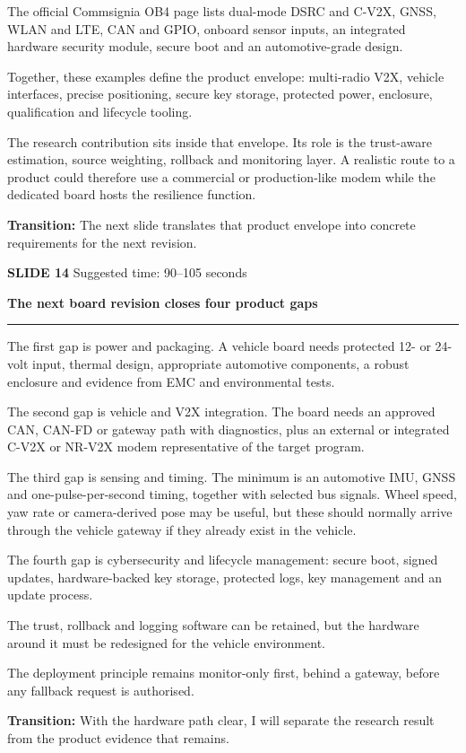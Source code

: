 \documentclass[11pt,a4paper]{article}
\newcommand{\slidetitle}[3]{%
  \clearpage
  {\color{BrandCyan}\large\bfseries SLIDE #1}\hfill
  {\color{Muted}\small Suggested time: #3}\par
  \vspace{0.18cm}
  {\color{BrandBlue}\LARGE\bfseries #2}\par
  \vspace{0.20cm}
  {\color{BrandMagenta}\rule{1.1cm}{1.2pt}}\par
  \vspace{0.12cm}
}
\newcommand{\transition}[1]{%
  \vfill
  \colorbox{Panel}{%
    \parbox{\dimexpr\textwidth-2\fboxsep\relax}{%
      \raggedright\textbf{Transition:} #1}}
}
\begin{document}
The official Commsignia OB4 page lists dual-mode DSRC and C-V2X, GNSS, WLAN and LTE, CAN and GPIO, onboard sensor inputs, an integrated hardware security module, secure boot and an automotive-grade design.

Together, these examples define the product envelope: multi-radio V2X, vehicle interfaces, precise positioning, secure key storage, protected power, enclosure, qualification and lifecycle tooling.

The research contribution sits inside that envelope. Its role is the trust-aware estimation, source weighting, rollback and monitoring layer. A realistic route to a product could therefore use a commercial or production-like modem while the dedicated board hosts the resilience function.

\transition{The next slide translates that product envelope into concrete requirements for the next revision.}

\slidetitle{14}{The next board revision closes four product gaps}{90--105 seconds}

The first gap is power and packaging. A vehicle board needs protected 12- or 24-volt input, thermal design, appropriate automotive components, a robust enclosure and evidence from EMC and environmental tests.

The second gap is vehicle and V2X integration. The board needs an approved CAN, CAN-FD or gateway path with diagnostics, plus an external or integrated C-V2X or NR-V2X modem representative of the target program.

The third gap is sensing and timing. The minimum is an automotive IMU, GNSS and one-pulse-per-second timing, together with selected bus signals. Wheel speed, yaw rate or camera-derived pose may be useful, but these should normally arrive through the vehicle gateway if they already exist in the vehicle.

The fourth gap is cybersecurity and lifecycle management: secure boot, signed updates, hardware-backed key storage, protected logs, key management and an update process.

The trust, rollback and logging software can be retained, but the hardware around it must be redesigned for the vehicle environment.

The deployment principle remains monitor-only first, behind a gateway, before any fallback request is authorised.

\transition{With the hardware path clear, I will separate the research result from the product evidence that remains.}
\end{document}
